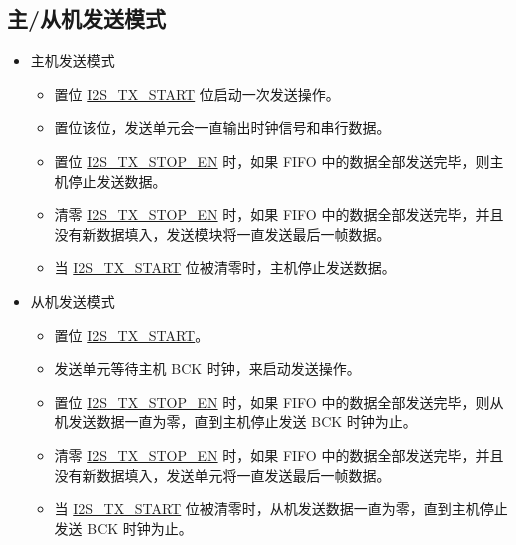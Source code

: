 \documentclass[main\_\_CN.tex]{subfiles}
\begin{document}
\subsection{主/从机发送模式} \label{sec:i2s-master-slave-tx-mode}
\begin{itemize}
    \item 主机发送模式
    \begin{itemize}
        \item 置位 \hyperref[fielddesc:I2STXSTART]{I2S\_TX\_START} 位启动一次发送操作。
        \item 置位该位，发送单元会一直输出时钟信号和串行数据。
        \item 置位 \hyperref[fielddesc:I2STXSTOPEN]{I2S\_TX\_STOP\_EN} 时，如果 FIFO 中的数据全部发送完毕，则主机停止发送数据。
        \item 清零 \hyperref[fielddesc:I2STXSTOPEN]{I2S\_TX\_STOP\_EN} 时，如果 FIFO 中的数据全部发送完毕，并且没有新数据填入，发送模块将一直发送最后一帧数据。
        \item 当 \hyperref[fielddesc:I2STXSTART]{I2S\_TX\_START} 位被清零时，主机停止发送数据。
    \end{itemize}
    \item 从机发送模式
     \begin{itemize}
        \item 置位 \hyperref[fielddesc:I2STXSTART]{I2S\_TX\_START}。
        \item 发送单元等待主机 BCK 时钟，来启动发送操作。
        \item 置位 \hyperref[fielddesc:I2STXSTOPEN]{I2S\_TX\_STOP\_EN} 时，如果 FIFO 中的数据全部发送完毕，则从机发送数据一直为零，直到主机停止发送 BCK 时钟为止。
        \item 清零 \hyperref[fielddesc:I2STXSTOPEN]{I2S\_TX\_STOP\_EN} 时，如果 FIFO 中的数据全部发送完毕，并且没有新数据填入，发送单元将一直发送最后一帧数据。
        \item 当 \hyperref[fielddesc:I2STXSTART]{I2S\_TX\_START} 位被清零时，从机发送数据一直为零，直到主机停止发送 BCK 时钟为止。
    \end{itemize}
\end{itemize}
\end{document}
